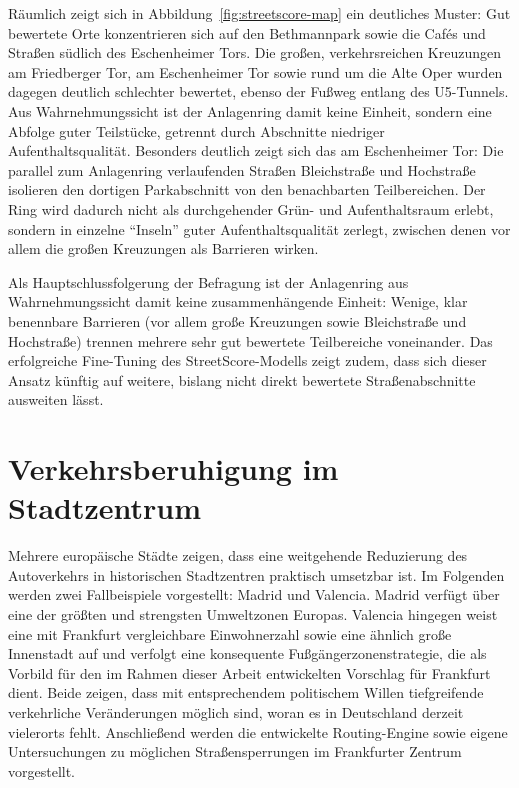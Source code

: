 \documentclass[a4paper,12pt]{article}
\begin{document}
Räumlich zeigt sich in Abbildung~\ref{fig:streetscore-map} ein deutliches Muster: Gut bewertete Orte konzentrieren sich auf den Bethmannpark sowie die Cafés und Straßen südlich des Eschenheimer Tors. Die großen, verkehrsreichen Kreuzungen am Friedberger Tor, am Eschenheimer Tor sowie rund um die Alte Oper wurden dagegen deutlich schlechter bewertet, ebenso der Fußweg entlang des U5-Tunnels. Aus Wahrnehmungssicht ist der Anlagenring damit keine Einheit, sondern eine Abfolge guter Teilstücke, getrennt durch Abschnitte niedriger Aufenthaltsqualität. Besonders deutlich zeigt sich das am Eschenheimer Tor: Die parallel zum Anlagenring verlaufenden Straßen Bleichstraße und Hochstraße isolieren den dortigen Parkabschnitt von den benachbarten Teilbereichen. Der Ring wird dadurch nicht als durchgehender Grün- und Aufenthaltsraum erlebt, sondern in einzelne \enquote{Inseln} guter Aufenthaltsqualität zerlegt, zwischen denen vor allem die großen Kreuzungen als Barrieren wirken.

Als Hauptschlussfolgerung der Befragung ist der Anlagenring aus Wahrnehmungssicht damit keine zusammenhängende Einheit: Wenige, klar benennbare Barrieren (vor allem große Kreuzungen sowie Bleichstraße und Hochstraße) trennen mehrere sehr gut bewertete Teilbereiche voneinander. Das erfolgreiche Fine-Tuning des StreetScore-Modells zeigt zudem, dass sich dieser Ansatz künftig auf weitere, bislang nicht direkt bewertete Straßenabschnitte ausweiten lässt.

\FloatBarrier

\clearpage
\section{Verkehrsberuhigung im Stadtzentrum}

Mehrere europäische Städte zeigen, dass eine weitgehende Reduzierung des Autoverkehrs in historischen Stadtzentren praktisch umsetzbar ist. Im Folgenden werden zwei Fallbeispiele vorgestellt: Madrid und Valencia. Madrid verfügt über eine der größten und strengsten Umweltzonen Europas. Valencia hingegen weist eine mit Frankfurt vergleichbare Einwohnerzahl sowie eine ähnlich große Innenstadt auf und verfolgt eine konsequente Fußgängerzonenstrategie, die als Vorbild für den im Rahmen dieser Arbeit entwickelten Vorschlag für Frankfurt dient. Beide zeigen, dass mit entsprechendem politischem Willen tiefgreifende verkehrliche Veränderungen möglich sind, woran es in Deutschland derzeit vielerorts fehlt. Anschließend werden die entwickelte Routing-Engine sowie eigene Untersuchungen zu möglichen Straßensperrungen im Frankfurter Zentrum vorgestellt.
\end{document}
